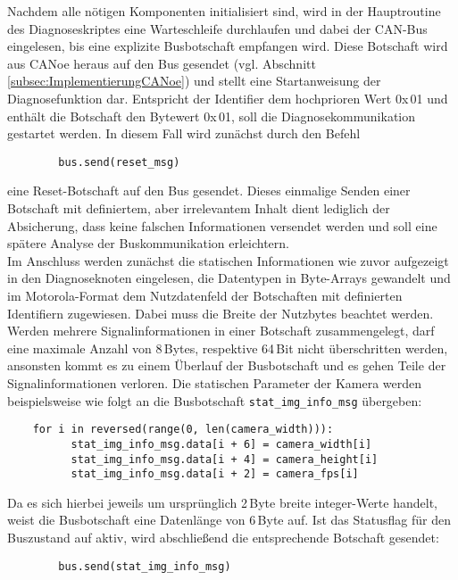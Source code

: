 Nachdem alle nötigen Komponenten initialisiert sind, wird in der Hauptroutine des Diagnoseskriptes eine Warteschleife durchlaufen und dabei der CAN-Bus eingelesen, bis eine explizite Busbotschaft empfangen wird. Diese Botschaft wird aus CANoe heraus auf den Bus gesendet (vgl. Abschnitt \ref{subsec:ImplementierungCANoe}) und stellt eine Startanweisung der Diagnosefunktion dar. Entspricht der Identifier dem hochprioren Wert 0x\,01 und enthält die Botschaft den Bytewert 0x\,01, soll die Diagnosekommunikation gestartet werden. In diesem Fall wird zunächst durch den Befehl 
\begin{addmargin}[1cm]{0cm} 
	\begin{verbatim}
		bus.send(reset_msg)
	\end{verbatim}
\end{addmargin}
eine Reset-Botschaft auf den Bus gesendet. Dieses einmalige Senden einer Botschaft mit definiertem, aber irrelevantem Inhalt dient lediglich der Absicherung, dass keine falschen Informationen versendet werden und soll eine spätere Analyse der Buskommunikation erleichtern.\\
Im Anschluss werden zunächst die statischen Informationen wie zuvor aufgezeigt in den Diagnoseknoten eingelesen, die Datentypen in Byte-Arrays gewandelt und im Motorola-Format dem Nutzdatenfeld der Botschaften mit definierten Identifiern zugewiesen. Dabei muss die Breite der Nutzbytes beachtet werden. Werden mehrere Signalinformationen in einer Botschaft zusammengelegt, darf eine maximale Anzahl von 8\,Bytes, respektive 64\,Bit nicht überschritten werden, ansonsten kommt es zu einem Überlauf der Busbotschaft und es gehen Teile der Signalinformationen verloren. Die statischen Parameter der Kamera werden beispielsweise wie folgt an die Busbotschaft \texttt{stat\_img\_info\_msg} übergeben:
\begin{addmargin}[1cm]{0cm} 
	\begin{verbatim}
	for i in reversed(range(0, len(camera_width))):
	      stat_img_info_msg.data[i + 6] = camera_width[i]
	      stat_img_info_msg.data[i + 4] = camera_height[i]
	      stat_img_info_msg.data[i + 2] = camera_fps[i]
	\end{verbatim}
\end{addmargin}
Da es sich hierbei jeweils um ursprünglich 2\,Byte breite integer-Werte handelt, weist die Busbotschaft eine Datenlänge von 6\,Byte auf. Ist das Statusflag für den Buszustand auf aktiv, wird abschließend die entsprechende Botschaft gesendet: 
\begin{addmargin}[1cm]{0cm} 
	\begin{verbatim}
		bus.send(stat_img_info_msg)
	\end{verbatim}
\end{addmargin}

